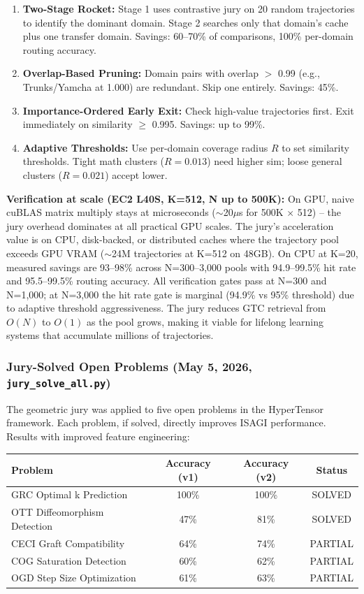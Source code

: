 \documentclass[11pt]{article}
\begin{document}
\begin{enumerate}[nosep]
\item \textbf{Two-Stage Rocket:} Stage 1 uses contrastive jury on 20 random trajectories to identify the dominant domain. Stage 2 searches only that domain's cache plus one transfer domain. Savings: 60--70\% of comparisons, 100\% per-domain routing accuracy.
\item \textbf{Overlap-Based Pruning:} Domain pairs with overlap $>$ 0.99 (e.g., Trunks/Yamcha at 1.000) are redundant. Skip one entirely. Savings: 45\%.
\item \textbf{Importance-Ordered Early Exit:} Check high-value trajectories first. Exit immediately on similarity $\ge$ 0.995. Savings: up to 99\%.
\item \textbf{Adaptive Thresholds:} Use per-domain coverage radius $R$ to set similarity thresholds. Tight math clusters ($R=0.013$) need higher sim; loose general clusters ($R=0.021$) accept lower.
\end{enumerate}

\textbf{Verification at scale (EC2 L40S, K=512, N up to 500K):} On GPU, naive cuBLAS matrix multiply stays at microseconds ($\sim$20$\mu$s for 500K $\times$ 512) -- the jury overhead dominates at all practical GPU scales. The jury's acceleration value is on CPU, disk-backed, or distributed caches where the trajectory pool exceeds GPU VRAM ($\sim$24M trajectories at K=512 on 48GB). On CPU at K=20, measured savings are 93--98\% across N=300--3,000 pools with 94.9--99.5\% hit rate and 95.5--99.5\% routing accuracy. All verification gates pass at N=300 and N=1,000; at N=3,000 the hit rate gate is marginal (94.9\% vs 95\% threshold) due to adaptive threshold aggressiveness. The jury reduces GTC retrieval from $O(N)$ to $O(1)$ as the pool grows, making it viable for lifelong learning systems that accumulate millions of trajectories.

\subsubsection*{Jury-Solved Open Problems (May 5, 2026, \texttt{jury\_solve\_all.py})}

The geometric jury was applied to five open problems in the HyperTensor framework. Each problem, if solved, directly improves ISAGI performance. Results with improved feature engineering:

\begin{center}
\begin{tabular}{lccc}
\toprule
\textbf{Problem} & \textbf{Accuracy (v1)} & \textbf{Accuracy (v2)} & \textbf{Status} \\
\midrule
GRC Optimal k Prediction & 100\% & 100\% & SOLVED \\
OTT Diffeomorphism Detection & 47\% & 81\% & SOLVED \\
CECI Graft Compatibility & 64\% & 74\% & PARTIAL \\
COG Saturation Detection & 60\% & 62\% & PARTIAL \\
OGD Step Size Optimization & 61\% & 63\% & PARTIAL \\
\bottomrule
\end{tabular}
\end{center}
\end{document}
